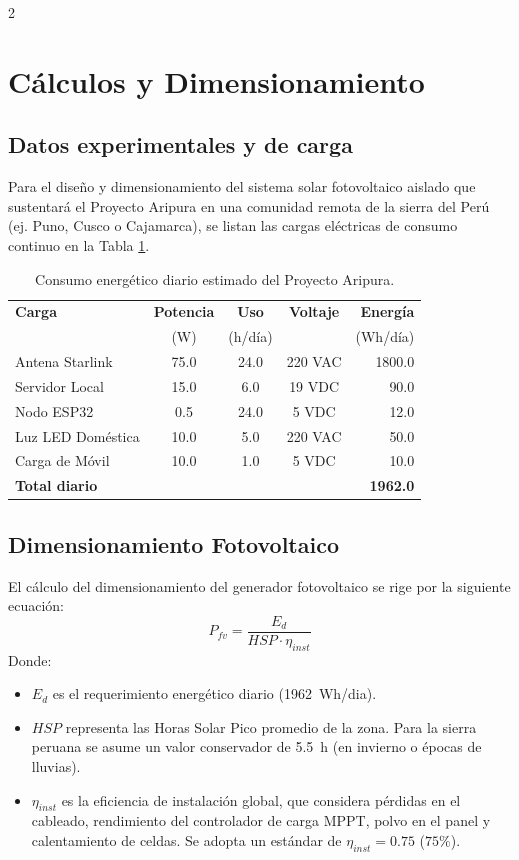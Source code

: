 \documentclass[a4paper, 11pt]{article}
\begin{document}
\begin{multicols}{2}
\section{Cálculos y Dimensionamiento}

\subsection{Datos experimentales y de carga}
Para el diseño y dimensionamiento del sistema solar fotovoltaico aislado que sustentará el Proyecto Aripura en una comunidad remota de la sierra del Perú (ej. Puno, Cusco o Cajamarca), se listan las cargas eléctricas de consumo continuo en la Tabla \ref{tab:cargas}.

\begin{table}[H]
\centering
\caption{Consumo energético diario estimado del Proyecto Aripura.}
\label{tab:cargas}
\begin{tabular}{lcccr}
\toprule
\textbf{Carga} & \textbf{Potencia} & \textbf{Uso} & \textbf{Voltaje} & \textbf{Energía} \\
& (W) & (h/día) & & (Wh/día) \\
\midrule
Antena Starlink & 75.0 & 24.0 & 220 VAC & 1800.0 \\
Servidor Local & 15.0 & 6.0 & 19 VDC & 90.0 \\
Nodo ESP32 & 0.5 & 24.0 & 5 VDC & 12.0 \\
Luz LED Doméstica & 10.0 & 5.0 & 220 VAC & 50.0 \\
Carga de Móvil & 10.0 & 1.0 & 5 VDC & 10.0 \\
\midrule
\textbf{Total diario} & & & & \textbf{1962.0} \\
\bottomrule
\end{tabular}
\end{table}

\subsection{Dimensionamiento Fotovoltaico}
El cálculo del dimensionamiento del generador fotovoltaico se rige por la siguiente ecuación:
\begin{equation}
    P_{fv} = \frac{E_d}{HSP \cdot \eta_{inst}}
\end{equation}
Donde:
\begin{itemize}
    \item $E_d$ es el requerimiento energético diario (\SI{1962}{Wh/dia}).
    \item $HSP$ representa las Horas Solar Pico promedio de la zona. Para la sierra peruana se asume un valor conservador de \SI{5.5}{h} (en invierno o épocas de lluvias).
    \item $\eta_{inst}$ es la eficiencia de instalación global, que considera pérdidas en el cableado, rendimiento del controlador de carga MPPT, polvo en el panel y calentamiento de celdas. Se adopta un estándar de $\eta_{inst} = 0.75$ ($75\%$).
\end{itemize}


\end{multicols}
\end{document}

